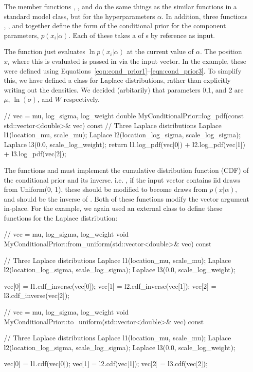 \documentclass[article]{jss}
\begin{document}
The member functions , , and
 do the same things as the similar functions in a standard model
class, but for the hyperparameters $\alpha$. 
In addition, three functions
, , and 
together define the form of the conditional prior for the
component parameters, $p(x_i | \alpha)$. Each of these takes a
 of s by reference as input.

The  function just evaluates $\ln p(x_i | \alpha)$
at the current value of $\alpha$. The position $x_i$ where this is evaluated
is passed in via the input vector. In the example, these
were defined using Equations~\ref{eqn:cond_prior1}--\ref{eqn:cond_prior3}.
To simplify this, we have defined a class for Laplace distributions,
rather than explicitly writing out the densities. We decided (arbitarily)
that parameters 0,1, and 2 are $\mu$, $\ln(\sigma)$, and $W$ respectively.
\begin{CodeChunk}
\begin{CodeInput}
// vec = {mu, log_sigma, log_weight}
double MyConditionalPrior::log_pdf(const std::vector<double>& vec) const
{
    // Three Laplace distributions
    Laplace l1(location_mu, scale_mu);
    Laplace l2(location_log_sigma, scale_log_sigma);
    Laplace l3(0.0, scale_log_weight);
	return l1.log_pdf(vec[0]) + l2.log_pdf(vec[1]) + l3.log_pdf(vec[2]);
}
\end{CodeInput}
\end{CodeChunk}

The functions  and  must implement
the cumulative distribution function (CDF) of the conditional
prior and its inverse. i.e. , if the input vector contains
iid draws from Uniform(0, 1), these should be modified to become draws from
$p(x|\alpha)$, and  should be the inverse of
.
Both of these functions modify the vector argument in-place.
For the example, we again used an external class to define these functions
for the Laplace distribution:

\begin{CodeChunk}
\begin{CodeInput}
// vec = {mu, log_sigma, log_weight}
void MyConditionalPrior::from_uniform(std::vector<double>& vec) const
{
    // Three Laplace distributions
    Laplace l1(location_mu, scale_mu);
    Laplace l2(location_log_sigma, scale_log_sigma);
    Laplace l3(0.0, scale_log_weight);

    vec[0] = l1.cdf_inverse(vec[0]);
    vec[1] = l2.cdf_inverse(vec[1]);
    vec[2] = l3.cdf_inverse(vec[2]);
}

// vec = {mu, log_sigma, log_weight}
void MyConditionalPrior::to_uniform(std::vector<double>& vec) const
{
    // Three Laplace distributions
    Laplace l1(location_mu, scale_mu);
    Laplace l2(location_log_sigma, scale_log_sigma);
    Laplace l3(0.0, scale_log_weight);

    vec[0] = l1.cdf(vec[0]);
    vec[1] = l2.cdf(vec[1]);
    vec[2] = l3.cdf(vec[2]);
}
\end{CodeInput}
\end{CodeChunk}
\end{document}

